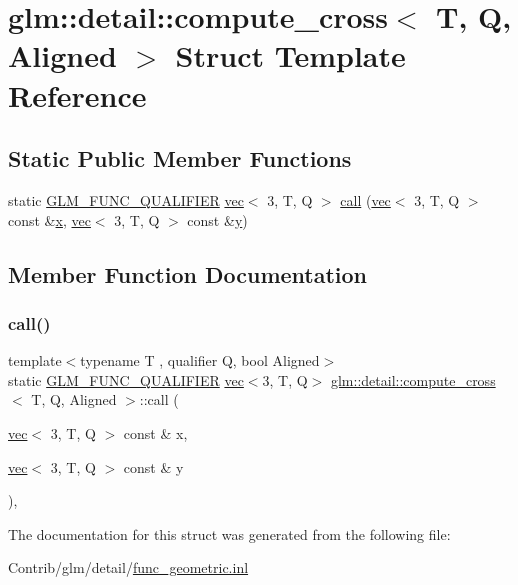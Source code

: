 \hypertarget{structglm_1_1detail_1_1compute__cross}{}\section{glm\+:\+:detail\+:\+:compute\+\_\+cross$<$ T, Q, Aligned $>$ Struct Template Reference}
\label{structglm_1_1detail_1_1compute__cross}
\subsection*{Static Public Member Functions}
\begin{DoxyCompactItemize}
\item 
static \mbox{\hyperlink{setup_8hpp_a33fdea6f91c5f834105f7415e2a64407}{G\+L\+M\+\_\+\+F\+U\+N\+C\+\_\+\+Q\+U\+A\+L\+I\+F\+I\+ER}} \mbox{\hyperlink{structglm_1_1vec}{vec}}$<$ 3, T, Q $>$ \mbox{\hyperlink{structglm_1_1detail_1_1compute__cross_af67135252e5e44f52bd67878a11dee13}{call}} (\mbox{\hyperlink{structglm_1_1vec}{vec}}$<$ 3, T, Q $>$ const \&\mbox{\hyperlink{_s_d_l__opengl_8h_ad0e63d0edcdbd3d79554076bf309fd47}{x}}, \mbox{\hyperlink{structglm_1_1vec}{vec}}$<$ 3, T, Q $>$ const \&\mbox{\hyperlink{_s_d_l__opengl_8h_a1675d9d7bb68e1657ff028643b4037e3}{y}})
\end{DoxyCompactItemize}


\subsection{Member Function Documentation}
\mbox{\label{structglm_1_1detail_1_1compute__cross_af67135252e5e44f52bd67878a11dee13}} 
\subsubsection{\texorpdfstring{call()}{call()}}
{\footnotesize\ttfamily template$<$typename T , qualifier Q, bool Aligned$>$ \\
static \mbox{\hyperlink{setup_8hpp_a33fdea6f91c5f834105f7415e2a64407}{G\+L\+M\+\_\+\+F\+U\+N\+C\+\_\+\+Q\+U\+A\+L\+I\+F\+I\+ER}} \mbox{\hyperlink{structglm_1_1vec}{vec}}$<$3, T, Q$>$ \mbox{\hyperlink{structglm_1_1detail_1_1compute__cross}{glm\+::detail\+::compute\+\_\+cross}}$<$ T, Q, Aligned $>$\+::call (\begin{DoxyParamCaption}\item[{\mbox{\hyperlink{structglm_1_1vec}{vec}}$<$ 3, T, Q $>$ const \&}]{x,  }\item[{\mbox{\hyperlink{structglm_1_1vec}{vec}}$<$ 3, T, Q $>$ const \&}]{y }\end{DoxyParamCaption})\hspace{0.3cm}{\ttfamily [inline]}, {\ttfamily [static]}}



The documentation for this struct was generated from the following file\+:\begin{DoxyCompactItemize}
\item 
Contrib/glm/detail/\mbox{\hyperlink{func__geometric_8inl}{func\+\_\+geometric.\+inl}}\end{DoxyCompactItemize}
